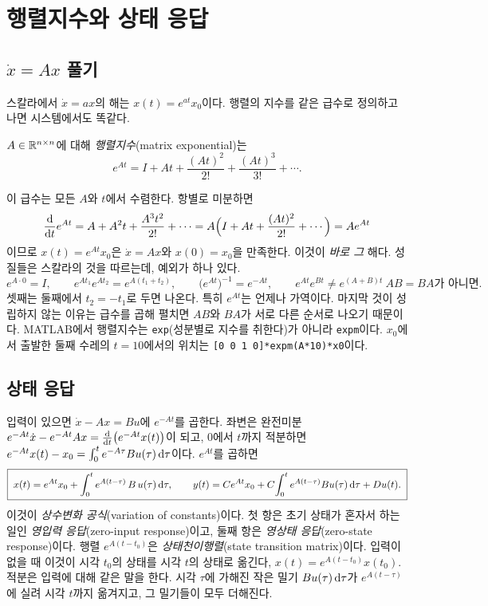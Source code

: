 \documentclass[11pt]{article}
\begin{document}
\section{행렬지수와 상태 응답}\label{sec:expm}

\subsection{\texorpdfstring{$\dot x=Ax$}{xdot = Ax} 풀기}
스칼라에서 $\dot x=ax$의 해는 $x(t)=e^{at}x_0$이다. 행렬의 지수를 같은 급수로
정의하고 나면 시스템에서도 똑같다.
\begin{definition}[행렬지수]
$A\in\mathbb{R}^{n\times n}$에 대해 \emph{행렬지수}(matrix exponential)는
\[
   e^{At} = I + At + \frac{(At)^{2}}{2!} + \frac{(At)^{3}}{3!} + \cdots .
\]
\end{definition}
이 급수는 모든 $A$와 $t$에서 수렴한다. 항별로 미분하면
\[
   \frac{\mathrm{d}}{\mathrm{d} t}e^{At} = A + A^{2}t + \frac{A^{3}t^{2}}{2!}+\cdots
   = A\Bigl(I+At+\frac{(At)^{2}}{2!}+\cdots\Bigr) = Ae^{At}
\]
이므로 $x(t)=e^{At}x_0$은 $\dot x=Ax$와 $x(0)=x_0$을 만족한다. 이것이 \emph{바로 그}
해다. 성질들은 스칼라의 것을 따르는데, 예외가 하나 있다.
\begin{equation}\label{eq:expmprops}
   e^{A\cdot0}=I,\qquad e^{At_1}e^{At_2}=e^{A(t_1+t_2)},\qquad
   \bigl(e^{At}\bigr)^{-1}=e^{-At},\qquad
   e^{At}e^{Bt}\neq e^{(A+B)t}\ \text{$AB=BA$가 아니면} .
\end{equation}
셋째는 둘째에서 $t_2=-t_1$로 두면 나온다. 특히 $e^{At}$는 언제나 가역이다. 마지막
것이 성립하지 않는 이유는 급수를 곱해 펼치면 $AB$와 $BA$가 서로 다른 순서로 나오기
때문이다. MATLAB에서 행렬지수는 \verb|exp|(성분별로 지수를 취한다)가 아니라
\verb|expm|이다. $x_0$에서 출발한 둘째 수레의 $t=10$에서의 위치는
\verb|[0 0 1 0]*expm(A*10)*x0|이다.

\subsection{상태 응답}\label{sec:stateresponse}
입력이 있으면 $\dot x-Ax=Bu$에 $e^{-At}$를 곱한다. 좌변은 완전미분
$e^{-At}\dot x-e^{-At}Ax=\frac{\mathrm{d}}{\mathrm{d} t}\bigl(e^{-At}x(t)\bigr)$이 되고, $0$에서
$t$까지 적분하면 $e^{-At}x(t)-x_0=\int_0^{t}e^{-A\tau}Bu(\tau)\,\mathrm{d}\tau$이다.
$e^{At}$를 곱하면
\begin{equation}\label{eq:voc}
   \boxed{\;x(t) = e^{At}x_0 + \int_{0}^{t} e^{A(t-\tau)}\,B\,u(\tau)\,\mathrm{d}\tau ,\qquad
   y(t) = Ce^{At}x_0 + C\!\int_{0}^{t} e^{A(t-\tau)}Bu(\tau)\,\mathrm{d}\tau + Du(t).\;}
\end{equation}
이것이 \emph{상수변화 공식}(variation of constants)이다. 첫 항은 초기 상태가 혼자서
하는 일인 \emph{영입력 응답}(zero-input response)이고, 둘째 항은 \emph{영상태
응답}(zero-state response)이다. 행렬 $e^{A(t-t_0)}$은 \emph{상태천이행렬}(state
transition matrix)이다. 입력이 없을 때 이것이 시각 $t_0$의 상태를 시각 $t$의 상태로
옮긴다, $x(t)=e^{A(t-t_0)}x(t_0)$. 적분은 입력에 대해 같은 말을 한다. 시각 $\tau$에
가해진 작은 밀기 $Bu(\tau)\,\mathrm{d}\tau$가 $e^{A(t-\tau)}$에 실려 시각 $t$까지 옮겨지고,
그 밀기들이 모두 더해진다.
\end{document}
